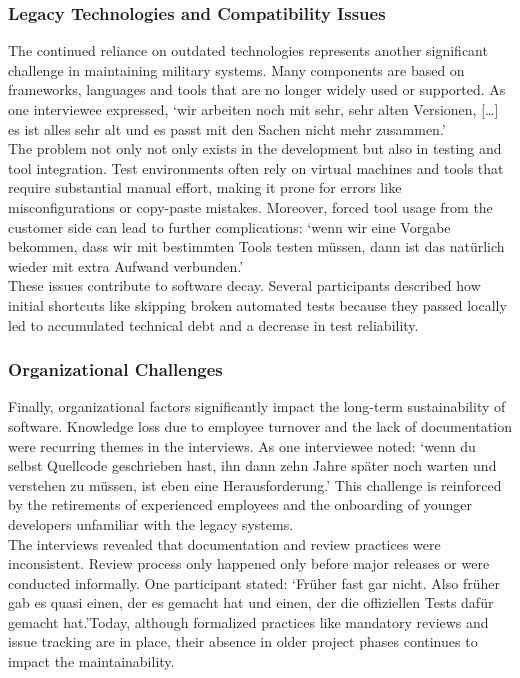 \subsubsection{Legacy Technologies and Compatibility Issues}
The continued reliance on outdated technologies represents another significant challenge in maintaining military systems. Many components are based on frameworks, languages and tools that are no longer widely used or supported.
As one interviewee expressed, `wir arbeiten noch mit sehr, sehr alten Versionen, [\ldots] es ist alles sehr alt und es passt mit den Sachen nicht mehr zusammen.'\\

The problem not only not only exists in the development but also in testing and tool integration. Test environments often rely on virtual machines and tools that require substantial manual effort, making it prone for errors like misconfigurations or copy-paste mistakes.
Moreover, forced tool usage from the customer side can lead to further complications: `wenn wir eine Vorgabe bekommen, dass wir mit bestimmten Tools testen müssen, dann ist das natürlich wieder mit extra Aufwand verbunden.'\\

These issues contribute to software decay. Several participants described how initial shortcuts like skipping broken automated tests because they passed locally led to accumulated technical debt and a decrease in test reliability.\\

\subsubsection{Organizational Challenges}
Finally, organizational factors significantly impact the long-term sustainability of software. Knowledge loss due to employee turnover and the lack of documentation were recurring themes in the interviews.
As one interviewee noted: `wenn du selbst Quellcode geschrieben hast, ihn dann zehn Jahre später noch warten und verstehen zu müssen, ist eben eine Herausforderung.' This challenge is reinforced by the retirements of experienced employees and the onboarding of younger developers
unfamiliar with the legacy systems.\\

The interviews revealed that documentation and review practices were inconsistent. Review process only happened only before major releases or were conducted informally. One participant stated:
`Früher fast gar nicht. Also früher gab es quasi einen, der es gemacht hat und einen, der die offiziellen Tests dafür gemacht hat.'Today, although formalized practices like mandatory reviews and issue tracking are in place, their absence in older project 
phases continues to impact the maintainability. 

